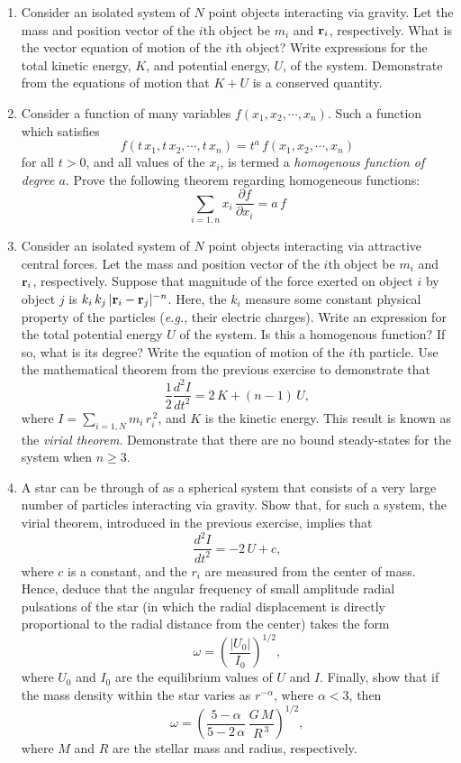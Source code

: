 {\small
\renewcommand{\theenumi}{2.\arabic{enumi}}
\begin{enumerate}
\item Consider an isolated system of $N$ point objects interacting via
gravity. Let the mass and position vector of the $i$th object be
 $m_i$ and  ${\bf r}_i$, respectively. What is  the vector equation
 of motion of the $i$th object? Write expressions for the total
 kinetic energy, $K$, and potential energy, $U$, of the system.
 Demonstrate from the equations of motion  that $K+U$ is a conserved quantity.
 
 \item Consider a function of many variables $f(x_1,x_2,\cdots,x_n)$. 
 Such a function which satisfies
 $$
 f(t\,x_1, t\,x_2,\cdots,t\,x_n) = t^a\,f(x_1,x_2,\cdots,x_n)
 $$
 for all $t>0$, and all values of the $x_i$, is termed a {\em homogenous function of degree $a$}. 
 Prove the following theorem regarding homogeneous functions:
 $$
 \sum_{i=1,n} x_i\,\frac{\partial f}{\partial x_i} = a\,f
 $$
 
  \item Consider an isolated system of $N$ point objects interacting via
attractive central forces. Let the mass and position vector of the $i$th object be
 $m_i$ and  ${\bf r}_i$, respectively. Suppose that magnitude of the force exerted on object $i$ by
object $j$ is $k_i\,k_j\,|{\bf r}_i-{\bf r}_j|^{-n}$. Here, the $k_i$ measure
some constant physical
property of the particles ({\em e.g.}, their electric charges). Write
an expression for the total potential energy $U$ of the system. Is
this a homogenous function? If so, what is its degree?
Write the equation of motion of the $i$th particle. Use the mathematical
theorem from the previous exercise to demonstrate that
$$
\frac{1}{2}\frac{d^2 I}{dt^2} = 2\,K + (n-1)\,U,
$$
where $I=\sum_{i=1,N} m_i\, r_i^{\,2}$, and $K$ is the kinetic energy.
This result is known as the {\em virial theorem}.
Demonstrate that there are no bound steady-states for the system
when $n\geq 3$. 
 
\item A star can be through of as a spherical system that consists of a very large number of particles interacting
via gravity.  Show that, for such a system, the virial theorem, introduced in the previous exercise, implies that
$$
\frac{d^2 I}{dt^2} = -2\,U + c,
$$
where $c$ is a constant, and the $r_i$ are measured from the center of mass. Hence, deduce that the angular frequency of small amplitude radial pulsations
of the star (in which the radial displacement is directly proportional to the radial distance from the center) takes the form
$$
\omega = \left(\frac{|U_0|}{I_0}\right)^{1/2},
$$
where $U_0$ and $I_0$ are the equilibrium values of $U$ and $I$. Finally, show that if the mass
density within the star varies as $r^{-\alpha}$, where $\alpha<3$, then
$$
\omega = \left(\frac{5-\alpha}{5-2\,\alpha}\,\frac{G\,M}{R^{\,3}}\right)^{1/2},
$$
where $M$ and $R$ are the stellar mass and radius, respectively.
 

\end{enumerate}}
